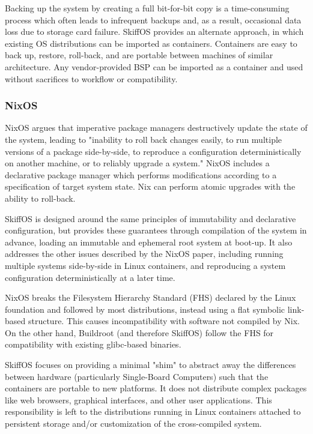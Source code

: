 \documentclass[english,]{IEEEtran}
\begin{document}
Backing up the system by creating a full bit-for-bit copy is a
time-consuming process which often leads to infrequent backups and, as a
result, occasional data loss due to storage card failure. SkiffOS
provides an alternate approach, in which existing OS distributions can
be imported as containers. Containers are easy to back up, restore,
roll-back, and are portable between machines of similar architecture.
Any vendor-provided BSP can be imported as a container and used without
sacrifices to workflow or compatibility.

\hypertarget{nixos}{%
\subsubsection{NixOS}\label{nixos}}

NixOS \autocite{nixos} argues that imperative package managers
destructively update the state of the system, leading to "inability to
roll back changes easily, to run multiple versions of a package
side-by-side, to reproduce a configuration deterministically on another
machine, or to reliably upgrade a system." NixOS includes a declarative
package manager which performs modifications according to a
specification of target system state. Nix can perform atomic upgrades
with the ability to roll-back.

SkiffOS is designed around the same principles of immutability and
declarative configuration, but provides these guarantees through
compilation of the system in advance, loading an immutable and ephemeral
root system at boot-up. It also addresses the other issues described by
the NixOS paper, including running multiple systems side-by-side in
Linux containers, and reproducing a system configuration
deterministically at a later time.

NixOS breaks the Filesystem Hierarchy Standard (FHS) \autocite{fhs}
declared by the Linux foundation and followed by most distributions,
instead using a flat symbolic link-based structure. This causes
incompatibility with software not compiled by Nix. On the other hand,
Buildroot \autocite{buildroot} (and therefore SkiffOS) follow the FHS
for compatibility with existing glibc-based binaries.

SkiffOS focuses on providing a minimal "shim" to abstract away the
differences between hardware (particularly Single-Board Computers) such
that the containers are portable to new platforms. It does not
distribute complex packages like web browsers, graphical interfaces, and
other user applications. This responsibility is left to the
distributions running in Linux containers attached to persistent storage
and/or customization of the cross-compiled system.
\end{document}
